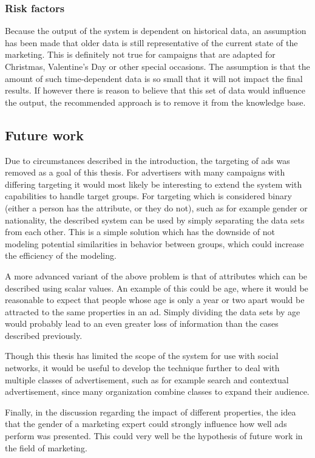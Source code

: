 \documentclass{sig-alternate}
\begin{document}
\subsubsection{Risk factors}
Because the output of the system is dependent on historical data, an assumption has been made that older data is still representative of the current state of the marketing. This is definitely not true for campaigns that are adapted for Christmas, Valentine's Day or other special occasions. The assumption is that the amount of such time-dependent data is so small that it will not impact the final results. If however there is reason to believe that this set of data would influence the output, the recommended approach is to remove it from the knowledge base.

\subsection{Future work}
Due to circumstances described in the introduction, the targeting of ads was removed as a goal of this thesis. For advertisers with many campaigns with differing targeting it would most likely be interesting to extend the system with capabilities to handle target groups. For targeting which is considered binary (either a person has the attribute, or they do not), such as for example gender or nationality, the described system can be used by simply separating the data sets from each other. This is a simple solution which has the downside of not modeling potential similarities in behavior between groups, which could increase the efficiency of the modeling.

A more advanced variant of the above problem is that of attributes which can be described using scalar values. An example of this could be age, where it would be reasonable to expect that people whose age is only a year or two apart would be attracted to the same properties in an ad. Simply dividing the data sets by age would probably lead to an even greater loss of information than the cases described previously.

Though this thesis has limited the scope of the system for use with social networks, it would be useful to develop the technique further to deal with multiple classes of advertisement, such as for example search and contextual advertisement, since many organization combine classes to expand their audience.

Finally, in the discussion regarding the impact of different properties, the idea that the gender of a marketing expert could strongly influence how well ads perform was presented. This could very well be the hypothesis of future work in the field of marketing.



\end{document}
